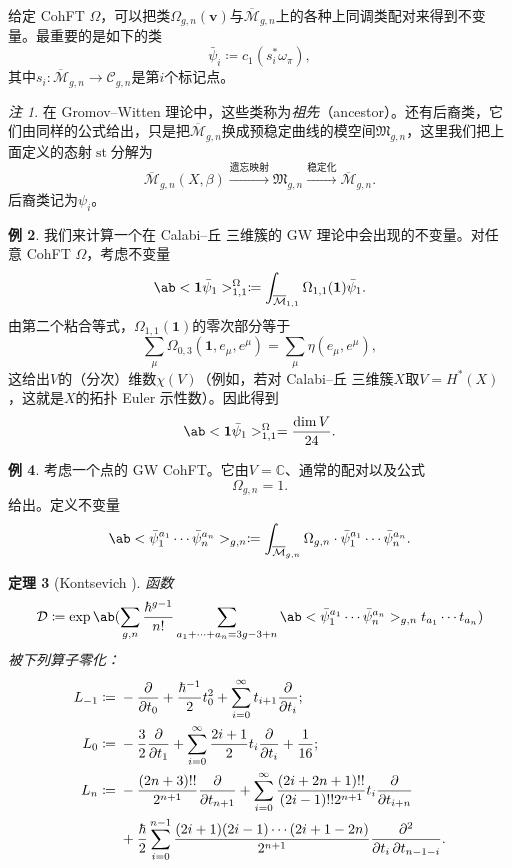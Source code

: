 \documentclass{amsart}
\newtheorem{thm}{定理}[section]
\theoremstyle{definition}
\newtheorem{exm}[thm]{例}
\theoremstyle{remark}
\newtheorem{rmk}[thm]{注}
\theoremstyle{plain}
\theoremstyle{definition}
\theoremstyle{remark}
\newcommand{\C}{\mathbb{C}}
\newcommand{\Mbar}{\overline{\mathcal{M}}}
\newcommand{\mc}[1]{\mathcal{#1}}
\newcommand{\mf}[1]{\mathfrak{#1}}
\newcommand{\mbf}[1]{\mathbf{#1}}
\newcommand{\bv}{\mbf{v}}
\newcommand{\1}{\mathbf{1}}
\newcommand{\2}{\mathbf{2}}
\newcommand{\3}{\mathbf{3}}
\DeclareMathOperator{\st}{st}
\begin{document}
给定 CohFT $\Omega$，可以把类$\Omega_{g,n}(\bv)$与$\Mbar_{g,n}$上的各种上同调类配对来得到不变量。最重要的是如下的类
\[ \bar{\psi}_i \coloneqq c_1( s_i^* \omega_{\pi} ), \]
其中$s_i \colon \Mbar_{g,n} \to \mc{C}_{g,n}$是第$i$个标记点。

\begin{rmk}
    在 Gromov--Witten 理论中，这些类称为\textit{祖先}（ancestor）。还有后裔类，它们由同样的公式给出，只是把$\Mbar_{g,n}$换成预稳定曲线的模空间$\mf{M}_{g,n}$，这里我们把上面定义的态射$\st$分解为
    \[ \Mbar_{g,n}(X,\beta) \xrightarrow{\text{遗忘映射}} \mf{M}_{g,n} \xrightarrow{\text{稳定化}} \Mbar_{g,n}. \]
    后裔类记为$\psi_i$。
\end{rmk}

\begin{exm}
    我们来计算一个在 Calabi--丘 三维簇的 GW 理论中会出现的不变量。对任意 CohFT $\Omega$，考虑不变量
    \[ \ab<\1\bar{\psi}_1>_{1,1}^{\Omega}\coloneqq \int_{\Mbar_{1,1}} \Omega_{1,1}(\1)\bar{\psi}_1. \]
    由第二个粘合等式，$\Omega_{1,1}(\1)$的零次部分等于
    \[ \sum_{\mu} \Omega_{0,3}(\1, e_{\mu}, e^{\mu}) = \sum_{\mu} \eta(e_{\mu}, e^{\mu}), \]
    这给出$V$的（分次）维数$\chi(V)$（例如，若对 Calabi--丘 三维簇\(X\)取\(V = H^*(X)\)，这就是\(X\)的拓扑 Euler 示性数）。因此得到
    \[ \ab<\1\bar{\psi}_1>_{1,1}^{\Omega} = \frac{\dim V}{24}. \]
\end{exm}

\begin{exm}
    考虑一个点的 GW CohFT。它由$V = \C$、通常的配对以及公式
    \[ \Omega_{g,n} = 1. \]
    给出。定义不变量
    \[ \ab<\bar{\psi}_1^{a_1} \cdots \bar{\psi}_n^{a_n}>_{g,n} \coloneqq \int_{\Mbar_{g,n}} \Omega_{g,n} \cdot \bar{\psi}_1^{a_1} \cdots \bar{\psi}_n^{a_n}. \]
    \begin{thm}[Kontsevich {\cite{Kontsevich1992}}]
        函数
        \[ \mc{D} \coloneqq \exp \ab(\sum_{g,n} \frac{\hbar^{g-1}}{n!}\sum_{a_1 + \cdots + a_n = 3g-3+n} \ab<\bar{\psi}_1^{a_1} \cdots \bar{\psi}_n^{a_n}>_{g,n} t_{a_1}\cdots t_{a_n}) \]
        被下列算子零化：
        \begin{align*}
            L_{-1} \coloneqq{}& -\pdv{}{t_0} + \frac{\hbar^{-1}}{2} t_0^2 + \sum_{i=0}^{\infty} t_{i+1} \pdv{}{t_i};\\
            L_0 \coloneqq{}& -\frac{3}{2} \pdv{}{t_1} + \sum_{i=0}^{\infty} \frac{2i+1}{2} t_i \pdv{}{t_i} + \frac{1}{16};\\
            L_n \coloneqq{}& -\frac{(2n+3)!!}{2^{n+1}} \pdv{}{t_{n+1}} + \sum_{i=0}^{\infty} \frac{(2i+2n+1)!!}{(2i-1)!! 2^{n+1}} t_i \pdv{}{t_{i+n}} \\
            &+ \frac{\hbar}{2} \sum_{i=0}^{n-1} \frac{(2i+1) (2i-1) \cdots (2i+1-2n)}{2^{n+1}} \pdv{}{t_i,t_{n-1-i}}.
        \end{align*}
    \end{thm}
\end{exm}
\end{document}

